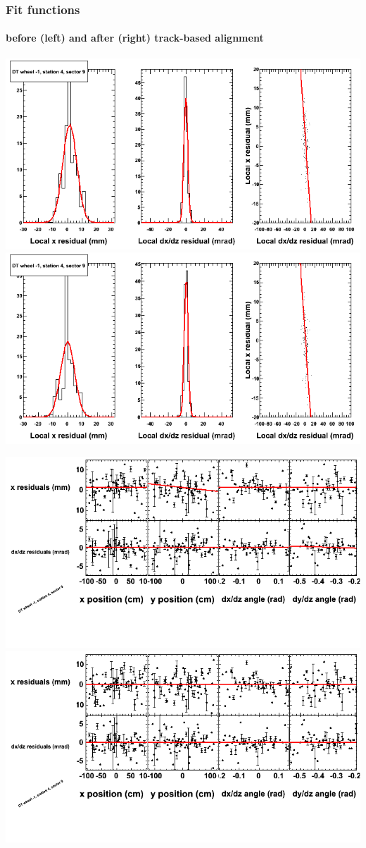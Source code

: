 \documentclass[compress]{beamer}
\begin{document}
\begin{frame}
\frametitle{Fit functions}
\framesubtitle{before (left) and after (right) track-based alignment}
\includegraphics[width=0.5\linewidth]{fitfunctions_re01/MBwhBst4sec09_bellcurves.png} \includegraphics[width=0.5\linewidth]{fitfunctions_re05/MBwhBst4sec09_bellcurves.png}

\includegraphics[width=0.5\linewidth]{fitfunctions_re01/MBwhBst4sec09_polynomials.png} \includegraphics[width=0.5\linewidth]{fitfunctions_re05/MBwhBst4sec09_polynomials.png}
\end{frame}
\end{document}
